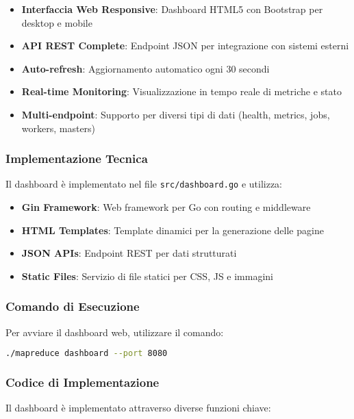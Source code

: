 \documentclass[12pt,a4paper]{article}
\begin{document}
\begin{itemize}
\item \textbf{Interfaccia Web Responsive}: Dashboard HTML5 con Bootstrap per desktop e mobile
\item \textbf{API REST Complete}: Endpoint JSON per integrazione con sistemi esterni
\item \textbf{Auto-refresh}: Aggiornamento automatico ogni 30 secondi
\item \textbf{Real-time Monitoring}: Visualizzazione in tempo reale di metriche e stato
\item \textbf{Multi-endpoint}: Supporto per diversi tipi di dati (health, metrics, jobs, workers, masters)
\end{itemize}

\subsubsection{Implementazione Tecnica}

Il dashboard è implementato nel file \texttt{src/dashboard.go} e utilizza:

\begin{itemize}
\item \textbf{Gin Framework}: Web framework per Go con routing e middleware
\item \textbf{HTML Templates}: Template dinamici per la generazione delle pagine
\item \textbf{JSON APIs}: Endpoint REST per dati strutturati
\item \textbf{Static Files}: Servizio di file statici per CSS, JS e immagini
\end{itemize}

\subsubsection{Comando di Esecuzione}

Per avviare il dashboard web, utilizzare il comando:

\begin{lstlisting}[language=bash, caption=Comando per avviare il dashboard]
./mapreduce dashboard --port 8080
\end{lstlisting}

\subsubsection{Codice di Implementazione}

Il dashboard è implementato attraverso diverse funzioni chiave:
\end{document}

